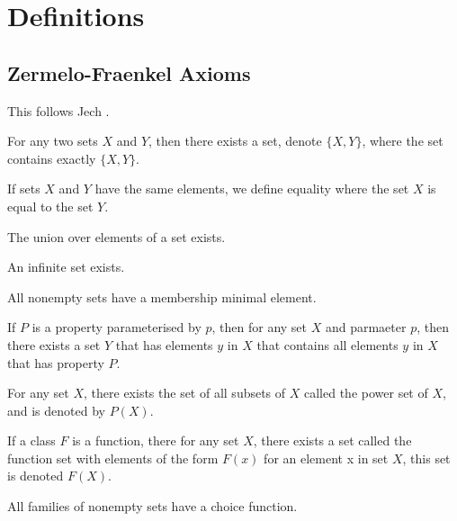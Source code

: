 \section{Definitions}

\subsection{Zermelo-Fraenkel Axioms}

This follows Jech \cite{Jech2006}.

\begin{definition}
	For any two sets $X$ and $Y$, then there exists a set, denote $\{X, Y\}$, where the set contains exactly $\{X, Y\}$.
\end{definition}

\begin{definition}
	If sets $X$ and $Y$ have the same elements, we define equality where the set $X$ is equal to the set $Y$.
\end{definition}

\begin{definition}
	The union over elements of a set exists.
\end{definition}

\begin{definition}
	An infinite set exists.
\end{definition}

\begin{definition}
	All nonempty sets have a membership minimal element.
\end{definition}

\begin{definition}
	If $P$ is a property parameterised by $p$, then for any set $X$ and parmaeter $p$, then there exists a set $Y$ that has elements $y$ in $X$ that contains all elements $y$ in $X$ that has property $P$.
\end{definition}

\begin{definition}
	For any set $X$, there exists the set of all subsets of $X$ called the power set of $X$, and is denoted by $P(X)$.
\end{definition}

\begin{definition}
	If a class $F$ is a function, there for any set $X$, there exists a set called the function set with elements of the form $F(x)$ for an element x in set $X$, this set is denoted $F(X)$.
\end{definition}

\begin{definition}
	All families of nonempty sets have a choice function.
\end{definition}